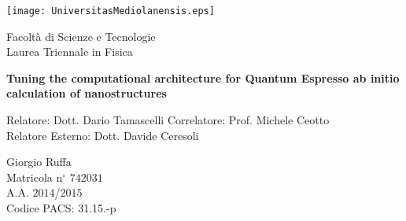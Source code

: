 {
\thispagestyle{empty}

\centerline{
\texttt{[image: UniversitasMediolanensis.eps]}
}

\begin{center}
{\Large Facolt\`a di Scienze e Tecnologie\\
\vskip0.2cm Laurea Triennale in Fisica }
\end{center}


\vskip1.5cm
\begin{center}
{\huge \textbf{Tuning the computational architecture for Quantum Espresso ab initio calculation of nanostructures}}
\end{center}

{\large
\vskip20mm Relatore:  Dott. Dario Tamascelli
\vskip 1mm Correlatore: Prof. Michele Ceotto\\
\vskip 1mm Relatore Esterno: Dott. Davide Ceresoli\\
}

\vskip2cm
\hskip9cm\parbox[t]{7cm}
{\large 
Giorgio Ruffa\\
Matricola n$^\circ$ $742031$\\
A.A. $2014$/$2015$\\
\vskip 0.5mm Codice PACS: 31.15.-p
}

\newpage
\newpage
\thispagestyle{empty}
\clearpage
}

